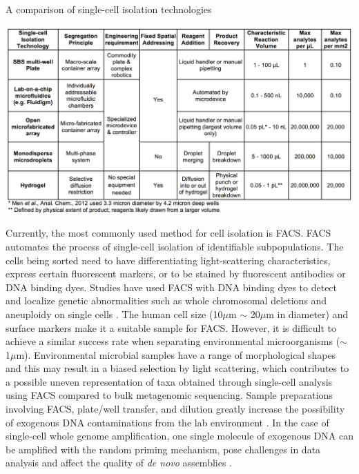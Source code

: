 \begin{table}[ht!]
\caption{A comparison of single-cell isolation technologies}
\label{tab:singlecellisolation}
\includegraphics[width=\linewidth]{./figures/TechnologyComparisons.png}
\end{table}

Currently, the most commonly used method for cell isolation is FACS. FACS automates the process of single-cell isolation of identifiable subpopulations. The cells being sorted need to have differentiating light-scattering characteristics, express certain fluorescent markers, or to be stained by fluorescent antibodies or DNA binding dyes. Studies have used FACS with DNA binding dyes to detect and localize genetic abnormalities such as whole chromosomal deletions and aneuploidy on single cells \cite{Trask:2002iy}. The human cell size (10$\mu$m $\sim$ 20$\mu$m in diameter) and surface markers make it a suitable sample for FACS. However, it is difficult to achieve a similar success rate when separating environmental microorganisms ($\sim$ 1$\mu$m). Environmental microbial samples have a range of morphological shapes and this may result in a biased selection by light scattering, which contributes to a possible uneven representation of taxa obtained through single-cell analysis using FACS compared to bulk metagenomic sequencing. Sample preparations involving FACS, plate/well transfer, and dilution greatly increase the possibility of exogenous DNA contaminations from the lab environment \cite{Woyke:2011eg}. In the case of single-cell whole genome amplification, one single molecule of exogenous DNA can be amplified with the random priming mechanism, pose challenges in data analysis and affect the quality of \textit{de novo} assemblies \cite{Blainey:2011dt}.

